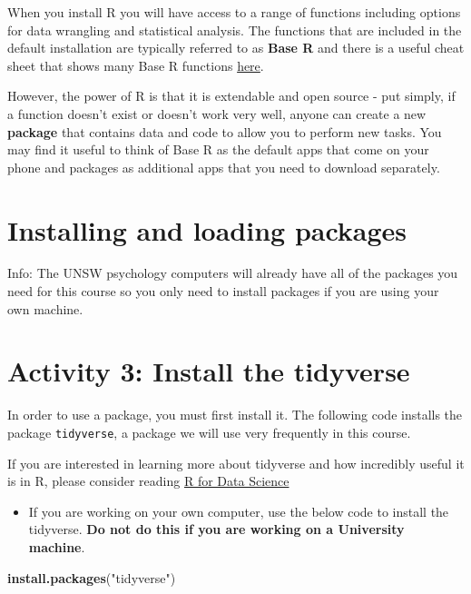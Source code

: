 \documentclass[
]{book}
\newenvironment{Shaded}{\begin{snugshade}}{\end{snugshade}}
\newcommand{\FunctionTok}[1]{\textcolor[rgb]{0.13,0.29,0.53}{\textbf{#1}}}
\newcommand{\NormalTok}[1]{#1}
\newcommand{\StringTok}[1]{\textcolor[rgb]{0.31,0.60,0.02}{#1}}
\providecommand{\tightlist}{%
  \setlength{\itemsep}{0pt}\setlength{\parskip}{0pt}}
\begin{document}
When you install R you will have access to a range of functions including options for data wrangling and statistical analysis. The functions that are included in the default installation are typically referred to as \textbf{Base R} and there is a useful cheat sheet that shows many Base R functions \href{https://stat.ethz.ch/R-manual/R-devel/library/base/html/00Index.html}{here}.

However, the power of R is that it is extendable and open source - put simply, if a function doesn't exist or doesn't work very well, anyone can create a new \textbf{package} that contains data and code to allow you to perform new tasks. You may find it useful to think of Base R as the default apps that come on your phone and packages as additional apps that you need to download separately.

\section{Installing and loading packages}\label{installing-and-loading-packages}

Info: The UNSW psychology computers will already have all of the packages you need for this course so you only need to install packages if you are using your own machine.

\section{Activity 3: Install the tidyverse}\label{activity-3-install-the-tidyverse}

In order to use a package, you must first install it. The following code installs the package \texttt{tidyverse}, a package we will use very frequently in this course.

If you are interested in learning more about tidyverse and how incredibly useful it is in R, please consider reading \href{https://r4ds.hadley.nz/}{R for Data Science}

\begin{itemize}
\tightlist
\item
  If you are working on your own computer, use the below code to install the tidyverse. \textbf{Do not do this if you are working on a University machine}.
\end{itemize}

\begin{Shaded}
\begin{Highlighting}[]
\FunctionTok{install.packages}\NormalTok{(}\StringTok{"tidyverse"}\NormalTok{)}
\end{Highlighting}
\end{Shaded}
\end{document}
